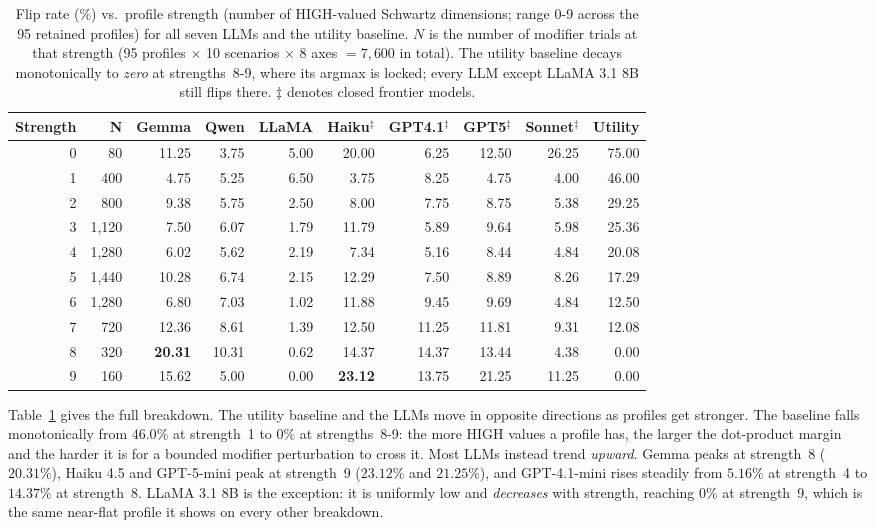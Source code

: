 \documentclass[11pt]{article}
\begin{document}
\begin{table}[t]
\centering\footnotesize
\setlength{\tabcolsep}{4pt}
\begin{tabular}{@{}rrrrrrrrrr@{}}
\toprule
\textbf{Strength} & \textbf{N} & \textbf{Gemma} & \textbf{Qwen} & \textbf{LLaMA} & \textbf{Haiku}$^\ddagger$ & \textbf{GPT4.1}$^\ddagger$ & \textbf{GPT5}$^\ddagger$ & \textbf{Sonnet}$^\ddagger$ & \textbf{Utility} \\
\midrule
0 & 80 & 11.25 & 3.75 & 5.00 & 20.00 & 6.25 & 12.50 & 26.25 & 75.00 \\
1 & 400 & 4.75 & 5.25 & 6.50 & 3.75 & 8.25 & 4.75 & 4.00 & 46.00 \\
2 & 800 & 9.38 & 5.75 & 2.50 & 8.00 & 7.75 & 8.75 & 5.38 & 29.25 \\
3 & 1{,}120 & 7.50 & 6.07 & 1.79 & 11.79 & 5.89 & 9.64 & 5.98 & 25.36 \\
4 & 1{,}280 & 6.02 & 5.62 & 2.19 & 7.34 & 5.16 & 8.44 & 4.84 & 20.08 \\
5 & 1{,}440 & 10.28 & 6.74 & 2.15 & 12.29 & 7.50 & 8.89 & 8.26 & 17.29 \\
6 & 1{,}280 & 6.80 & 7.03 & 1.02 & 11.88 & 9.45 & 9.69 & 4.84 & 12.50 \\
7 & 720 & 12.36 & 8.61 & 1.39 & 12.50 & 11.25 & 11.81 & 9.31 & 12.08 \\
8 & 320 & \textbf{20.31} & 10.31 & 0.62 & 14.37 & 14.37 & 13.44 & 4.38 & 0.00 \\
9 & 160 & 15.62 & 5.00 & 0.00 & \textbf{23.12} & 13.75 & 21.25 & 11.25 & 0.00 \\
\bottomrule
\end{tabular}
\caption{Flip rate (\%) vs.\ profile strength (number of HIGH-valued Schwartz dimensions; range 0-9 across the 95 retained profiles) for all seven LLMs and the utility baseline. $N$ is the number of modifier trials at that strength (95 profiles $\times$ 10 scenarios $\times$ 8 axes $=7{,}600$ in total). The utility baseline decays monotonically to \emph{zero} at strengths~8-9, where its argmax is locked; every LLM except LLaMA 3.1 8B still flips there. $\ddagger$ denotes closed frontier models.}
\label{tab:strength}
\end{table}

Table~\ref{tab:strength} gives the full breakdown. The utility baseline and the LLMs move in opposite directions as profiles get stronger. The baseline falls monotonically from $46.0\%$ at strength~1 to $0\%$ at strengths~8-9: the more HIGH values a profile has, the larger the dot-product margin and the harder it is for a bounded modifier perturbation to cross it. Most LLMs instead trend \emph{upward}. Gemma peaks at strength~8 ($20.31\%$), Haiku 4.5 and GPT-5-mini peak at strength~9 ($23.12\%$ and $21.25\%$), and GPT-4.1-mini rises steadily from $5.16\%$ at strength~4 to $14.37\%$ at strength~8. LLaMA 3.1 8B is the exception: it is uniformly low and \emph{decreases} with strength, reaching $0\%$ at strength~9, which is the same near-flat profile it shows on every other breakdown.
\end{document}
